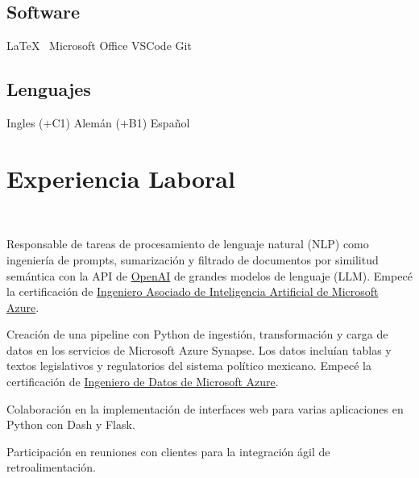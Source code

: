 \documentclass[]{tex/deedy-resume-openfont}
\begin{document}
\begin{minipage}[t]{0.33\textwidth}
\subsection{Software}
\LaTeX\ \textbullet{} Microsoft Office \textbullet{} VSCode \textbullet{} Git
\sectionsep

\subsection{Lenguajes}
Ingles ($+$C1) \textbullet{} Alemán ($+$B1) \textbullet{} Español

%
%

\end{minipage} 
\hfill
\begin{minipage}[t]{0.66\textwidth} 


\section{Experiencia Laboral}

\\
\vspace{\topsep}
\vspace{\topsep} %
\begin{tightemize}
\item Responsable de tareas de procesamiento de lenguaje natural (NLP) como ingeniería de prompts, sumarización y filtrado de documentos por similitud semántica con la API de \href{https://openai.com/}{OpenAI} de grandes modelos de lenguaje (LLM). Empecé la certificación de \href{https://learn.microsoft.com/en-us/certifications/azure-ai-engineer/}{Ingeniero Asociado de Inteligencia Artificial de Microsoft Azure}.
\item Creación de una pipeline con Python de ingestión, transformación y carga de datos en los servicios de Microsoft Azure Synapse. Los datos incluían tablas y textos legislativos y regulatorios del sistema político mexicano. Empecé la certificación de \href{https://learn.microsoft.com/en-us/certifications/azure-data-engineer/}{Ingeniero de Datos de Microsoft Azure}.
\item Colaboración en la implementación de interfaces web para varias aplicaciones en Python con Dash y Flask.
\item Participación en reuniones con clientes para la integración ágil de retroalimentación.
\end{tightemize}
\sectionsep


\end{minipage}
\end{document}
